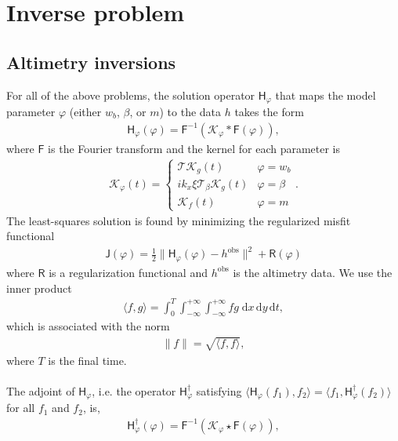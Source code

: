 \documentclass[paper=a4, fontsize=11pt]{article}
\begin{document}
\section*{Inverse problem}
\subsection*{Altimetry inversions}
For all of the above problems, the solution operator $\mathsf{H}_\varphi$ that maps the model
parameter $\varphi$ (either $w_b$, $\beta$, or $m$) to the data $h$ takes the form
\begin{align}
\mathsf{H}_\varphi(\varphi) = \mathsf{F}^{-1} \left( \mathcal{K}_\varphi* \mathsf{F}(\varphi)\right),
\end{align}
where $\mathsf{F}$ is the Fourier transform and the kernel for each parameter is
\begin{align}
\mathcal{K}_\varphi(t) =
\begin{cases}
\mathcal{T}\mathcal{K}_g(t) & \varphi = w_b \\
ik_x\xi\mathcal{T}_{\beta}\mathcal{K}_g(t) & \varphi = \beta \\
\mathcal{K}_f(t) & \varphi = m
\end{cases} .
\end{align}
The least-squares solution is found by minimizing the regularized misfit functional
\begin{align}
\mathsf{J}(\varphi) = \frac{1}{2}\| \mathsf{H}_\varphi(\varphi) - h^{\mathrm{obs}} \|^2 + \mathsf{R}(\varphi) \label{lsq}
\end{align}
where $\mathsf{R}$ is a regularization functional and $h^{\mathrm{obs}}$ is the altimetry data.
We use the inner product
\begin{align}
\langle f,g\rangle = \int_0^T \int_{-\infty}^{+\infty} \int_{-\infty}^{+\infty} fg \;\mathrm{d}x\,\mathrm{d}y\,\mathrm{d}t,
\end{align}
which is associated with the norm
\begin{align}
\| f \| = \sqrt{\langle f,f\rangle},
\end{align}
where $T$ is the final time.
\\ \\
The adjoint of $\mathsf{H}_\varphi$, i.e. the operator $\mathsf{H}_\varphi^\dagger$  satisfying
$\langle \mathsf{H}_\varphi(f_1),f_2 \rangle = \langle f_1, \mathsf{H}_\varphi^\dagger(f_2)
\rangle$ for all $f_1$ and $f_2$, is,
\begin{align}
\mathsf{H}_\varphi^\dagger (\varphi) = \mathsf{F}^{-1} \left( \mathcal{K}_\varphi \star \mathsf{F}(\varphi)\right),
\end{align}
\end{document}

